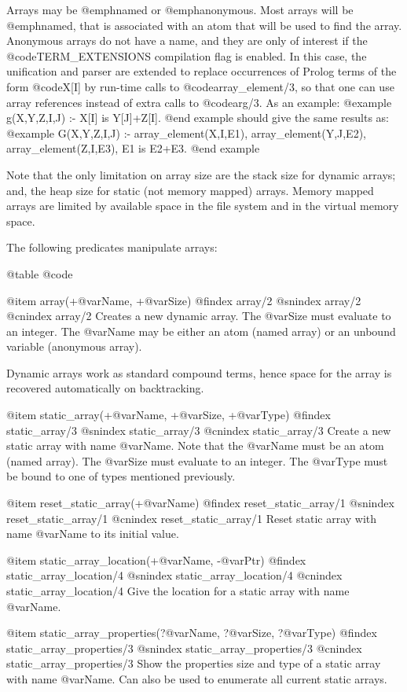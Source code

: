 {{{{{{{Arrays may be @emph{named} or @emph{anonymous}. Most arrays will be
@emph{named}, that is associated with an atom that will be used to find
the array. Anonymous arrays do not have a name, and they are only of
interest if the @code{TERM_EXTENSIONS} compilation flag is enabled. In
this case, the unification and parser are extended to replace
occurrences of Prolog terms of the form @code{X[I]} by run-time calls to
@code{array_element/3}, so that one can use array references instead of
extra calls to @code{arg/3}. As an example:
@example
g(X,Y,Z,I,J) :- X[I] is Y[J]+Z[I].
@end example
should give the same results as:
@example
G(X,Y,Z,I,J) :-
        array_element(X,I,E1),
        array_element(Y,J,E2),  
        array_element(Z,I,E3),  
        E1 is E2+E3.
@end example

Note that the only limitation on array size are the stack size for
dynamic arrays; and, the heap size for static (not memory mapped)
arrays. Memory mapped arrays are limited by available space in the file
system and in the virtual memory space.

The following predicates manipulate arrays:

@table @code

@item array(+@var{Name}, +@var{Size})
@findex array/2
@snindex array/2
@cnindex array/2
Creates a new dynamic array. The @var{Size} must evaluate to an
integer. The @var{Name} may be either an atom (named array) or an
unbound variable (anonymous array).

Dynamic arrays work as standard compound terms, hence space for the
array is recovered automatically on backtracking.

@item static_array(+@var{Name}, +@var{Size}, +@var{Type})
@findex static_array/3
@snindex static_array/3
@cnindex static_array/3
Create a new static array with name @var{Name}. Note that the @var{Name}
must be an atom (named array). The @var{Size} must evaluate to an
integer.  The @var{Type} must be bound to one of types mentioned
previously.

@item reset_static_array(+@var{Name})
@findex reset_static_array/1
@snindex reset_static_array/1
@cnindex reset_static_array/1
Reset static array with name @var{Name} to its initial value.

@item static_array_location(+@var{Name}, -@var{Ptr})
@findex static_array_location/4
@snindex static_array_location/4
@cnindex static_array_location/4
Give the location for  a static array with name
@var{Name}.

@item static_array_properties(?@var{Name}, ?@var{Size}, ?@var{Type})
@findex static_array_properties/3
@snindex static_array_properties/3
@cnindex static_array_properties/3
Show the properties size and type of a static array with name
@var{Name}. Can also be used to enumerate all current
static arrays. 

}}}}}}}

